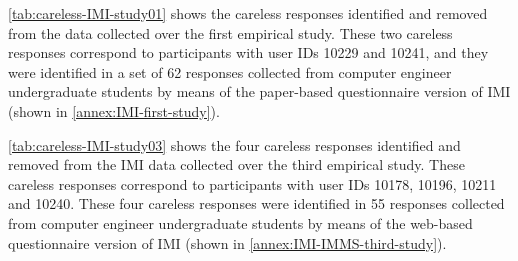 \autoref{tab:careless-IMI-study01} shows the careless responses identified and removed from the data collected over the first empirical study. These two careless responses correspond to participants with user IDs 10229 and 10241, and they were identified in a set of 62 responses collected from computer engineer undergraduate students by means of the paper-based questionnaire version of IMI (shown in \autoref{annex:IMI-first-study}).


\autoref{tab:careless-IMI-study03} shows the four careless responses identified and removed from the IMI data collected over the third empirical study. These careless responses correspond to participants with user IDs 10178, 10196, 10211 and 10240. These four careless responses were identified in 55 responses collected from computer engineer undergraduate students by means of the web-based questionnaire version of IMI (shown in \autoref{annex:IMI-IMMS-third-study}).

